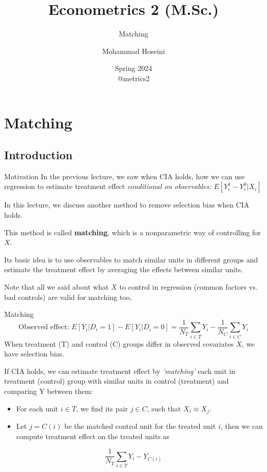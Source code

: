 \documentclass[handout]{beamer}
\begin{document}
	\title[Econometrics 2]{Econometrics 2 (M.Sc.)}
	\subtitle{Matching}
	\author[Mohammad Hoseini]{Mohammad Hoseini}
	
	
	\date[Spring 2024]{Spring 2024 \\
	\vspace{10pt} @metrics2
}
	
\begin{frame}[plain]
	\titlepage
\end{frame}

\section{Matching}
\subsection{Introduction}

\begin{frame}{Motivation}
In the previous lecture, we saw when CIA holds, how we can use regression to estimate treatment effect \textit{ conditional on observables:} $E[Y_i^1-Y_i^0 |X_i]$\bigskip

In this lecture, we discuss another method to remove selection bias when CIA holds.\bigskip

This method is called \textbf{matching}, which is a nonparametric way of controlling for $X$.\bigskip	

Its basic idea is to use observables to match similar units in different groups and estimate the treatment effect by averaging the effects between similar units.\bigskip

Note that all we said about what $X$ to control in regression (common factors vs. bad controls) are valid for matching too.
	
\end{frame}


\begin{frame}{Matching}
	\[\text{Observed effect: } E[Y_i|D_i=1]-E[Y_i|D_i=0]=\frac{1}{N_T}\sum_{i\in T}Y_i-\frac{1}{N_C}\sum_{i\in C}Y_i \]
	When treatment (T) and control (C) groups differ in observed covariates $X$, we have selection bias.\bigskip
	
	If CIA holds, we can estimate treatment effect by \textit{'matching'} each unit in treatment (control) group with similar units in control (treatment) and comparing Y between them:\medskip
	
	\begin{itemize}
		\item For each unit $i \in T$, we find its pair $j \in C$, such that $X_i\approx X_j$.
		\item Let $j=C(i)$ be the matched control unit for the treated unit $i$, then we can compute treatment effect on the treated units as
	\end{itemize}
	\[\frac{1}{N_T}\sum_{i\in T}Y_i-Y_{C(i)}\]   
	
\end{frame}
\end{document}
